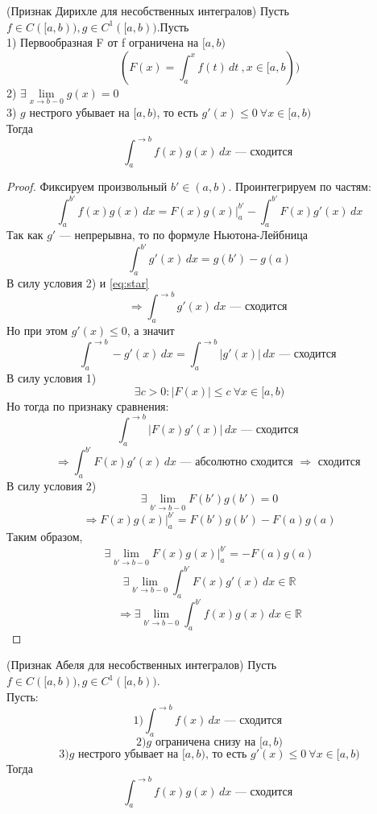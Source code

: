\documentclass[11pt]{article}
\begin{document}
\begin{theorem}
    (Признак Дирихле для несобственных интегралов) Пусть $f\in C([a,b)), g\in C^1([a,b))$.Пусть\\
    1) Первообразная F от f ограничена на $[a,b)$\\
    \[ (F(x)=\int_{a}^{x}f(t)\,dt \ ,x\in[a,b)) \] 
    2) $\exists \lim\limits_{x\to b-0} g(x) =0 $\\
    3) $g$ нестрого убывает на $[a,b)$, то есть  $g'(x)\le 0 \ \forall x\in [a,b)$\\
    Тогда
    \[ \int_{a}^{\to b}f(x)g(x)\, dx \text{ --- сходится }\]
\end{theorem}

\begin{proof}
    Фиксируем произвольный $b'\in (a,b)$. Проинтегрируем по частям:
    \[ \int_{a}^{b'} f(x)g(x)\, dx = F(x)g(x) \bigg|_a^{b'} - \int_{a}^{b'}F(x)g'(x)\, dx \]
    Так как $g'$ --- непрерывна, то по формуле Ньютона-Лейбница
    \[ \int_{a}^{b'} g'(x)\,dx = g(b') - g(a) \tag{*}\label{eq:star}\]
    В силу условия 2) и \eqref{eq:star} 
    \[ \Rightarrow \int_{a}^{\to b} g'(x)\, dx \text{ --- сходится } \]
    Но при этом $g'(x)\le 0$, а значит
    \[ \int_{a}^{\to b} -g'(x)\, dx = \int_{a}^{\to b} |g'(x)|\,dx \text{ --- сходится } \]
    В силу условия 1) 
    \[ \exists c>0: |F(x)| \le c \ \forall x\in[a,b) \]
    Но тогда по признаку сравнения:
    \[ \int_{a}^{\to b} |F(x)g'(x)|\, dx \text{ --- сходится } \] 
    \[ \Rightarrow \int_{a}^{b'}F(x)g'(x)\, dx \text{ --- абсолютно сходится }\Rightarrow \text{ сходится } \]
    В силу условия 2)
    \[ \exists \lim\limits_{b'\to b-0} F(b')g(b') =0 \]
    \[ \Rightarrow F(x)g(x) \bigg|_a^{b'} = F(b')g(b') - F(a)g(a) \]
    Таким образом, 
    \[ \exists \lim\limits_{b'\to b-0} F(x)g(x) \bigg|_a^{b'} = -F(a)g(a)\]
    \[ \exists \lim\limits_{b'\to b-0} \int_{a}^{b'} F(x)g'(x)\, dx \in \mathbb{R}\]
    \[ \Rightarrow \exists \lim\limits_{b'\to b-0} \int_{a}^{b'} f(x)g(x)\, dx \in \mathbb{R} \]
\end{proof}

\begin{theorem}
    (Признак Абеля для несобственных интегралов) Пусть $f\in C([a,b)), g\in C^1([a,b))$.\\
    Пусть:
    \[ 1) \int_{a}^{\to b} f(x)\, dx \text{ --- сходится } \]
    \[ 2) g \text{ ограничена снизу на } [a,b) \]
    \[ 3) g \text{ нестрого убывает на } [a,b) \text{, то есть } g'(x)\le 0 \ \forall x\in [a,b) \]
    Тогда 
    \[ \int_{a}^{\to b}f(x)g(x)\, dx \text{ --- сходится }\]
\end{theorem}
\end{document}
